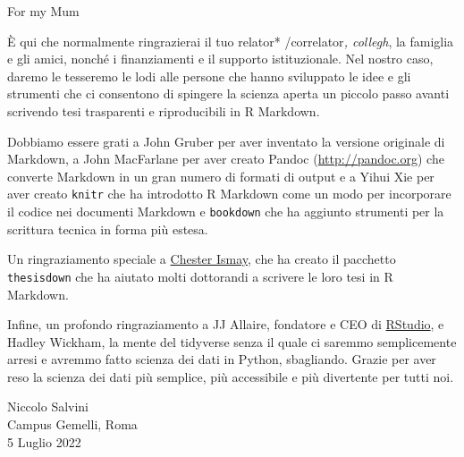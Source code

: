 \documentclass[a4paper, 11pt, nobind]{templates/ociamthesis}
\begin{document}

\begin{romanpages}

\maketitle

\begin{dedication}
  For my Mum
\end{dedication}



\begin{acknowledgements}
 	È qui che normalmente ringrazierai il tuo relator* /correlator\emph{, collegh}, la famiglia e gli amici, nonché i finanziamenti e il supporto istituzionale. Nel nostro caso, daremo le tesseremo le lodi alle persone che hanno sviluppato le idee e gli strumenti che ci consentono di spingere la scienza aperta un piccolo passo avanti scrivendo tesi trasparenti e riproducibili in R Markdown.

 Dobbiamo essere grati a John Gruber per aver inventato la versione originale di Markdown, a John MacFarlane per aver creato Pandoc (\url{http://pandoc.org}) che converte Markdown in un gran numero di formati di output e a Yihui Xie per aver creato \texttt{knitr} che ha introdotto R Markdown come un modo per incorporare il codice nei documenti Markdown e \texttt{bookdown} che ha aggiunto strumenti per la scrittura tecnica in forma più estesa.

 Un ringraziamento speciale a \href{http://chester.rbind.io}{Chester Ismay}, che ha creato il pacchetto \texttt{thesisdown} che ha aiutato molti dottorandi a scrivere le loro tesi in R Markdown.

 Infine, un profondo ringraziamento a JJ Allaire, fondatore e CEO di \href{http://rstudio.com}{RStudio}, e Hadley Wickham, la mente del tidyverse senza il quale ci saremmo semplicemente arresi e avremmo fatto scienza dei dati in Python, sbagliando. Grazie per aver reso la scienza dei dati più semplice, più accessibile e più divertente per tutti noi.

 \begin{flushright}
 Niccolo Salvini \\
 Campus Gemelli, Roma \\
 5 Luglio 2022
 \end{flushright}
\end{acknowledgements}




\end{romanpages}
\end{document}
